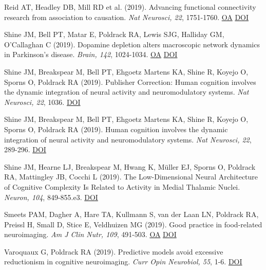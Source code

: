 \documentclass[10pt, letterpaper]{article}
\begin{document}
Reid AT, Headley DB, Mill RD et al. (2019). Advancing functional connectivity research from association to causation. \textit{Nat Neurosci, 22}, 1751-1760. \href{https://www.ncbi.nlm.nih.gov/pmc/articles/PMC7289187}{OA} \href{http://dx.doi.org/10.1038/s41593-019-0510-4}{DOI} \vspace{2mm}

Shine JM, Bell PT, Matar E, Poldrack RA, Lewis SJG, Halliday GM, O'Callaghan C (2019). Dopamine depletion alters macroscopic network dynamics in Parkinson's disease. \textit{Brain, 142}, 1024-1034. \href{https://www.ncbi.nlm.nih.gov/pmc/articles/PMC6904322}{OA} \href{http://dx.doi.org/10.1093/brain/awz034}{DOI} \vspace{2mm}

Shine JM, Breakspear M, Bell PT, Ehgoetz Martens KA, Shine R, Koyejo O, Sporns O, Poldrack RA (2019). Publisher Correction: Human cognition involves the dynamic integration of neural activity and neuromodulatory systems. \textit{Nat Neurosci, 22}, 1036. \href{http://dx.doi.org/10.1038/s41593-019-0347-x}{DOI} \vspace{2mm}

Shine JM, Breakspear M, Bell PT, Ehgoetz Martens KA, Shine R, Koyejo O, Sporns O, Poldrack RA (2019). Human cognition involves the dynamic integration of neural activity and neuromodulatory systems. \textit{Nat Neurosci, 22}, 289-296. \href{http://dx.doi.org/10.1038/s41593-018-0312-0}{DOI} \vspace{2mm}

Shine JM, Hearne LJ, Breakspear M, Hwang K, Müller EJ, Sporns O, Poldrack RA, Mattingley JB, Cocchi L (2019). The Low-Dimensional Neural Architecture of Cognitive Complexity Is Related to Activity in Medial Thalamic Nuclei. \textit{Neuron, 104}, 849-855.e3. \href{http://dx.doi.org/10.1016/j.neuron.2019.09.002}{DOI} \vspace{2mm}

Smeets PAM, Dagher A, Hare TA, Kullmann S, van der Laan LN, Poldrack RA, Preissl H, Small D, Stice E, Veldhuizen MG (2019). Good practice in food-related neuroimaging. \textit{Am J Clin Nutr, 109}, 491-503. \href{https://www.ncbi.nlm.nih.gov/pmc/articles/PMC7945961}{OA} \href{http://dx.doi.org/10.1093/ajcn/nqy344}{DOI} \vspace{2mm}

Varoquaux G, Poldrack RA (2019). Predictive models avoid excessive reductionism in cognitive neuroimaging. \textit{Curr Opin Neurobiol, 55}, 1-6. \href{http://dx.doi.org/10.1016/j.conb.2018.11.002}{DOI} \vspace{2mm}
\end{document}

